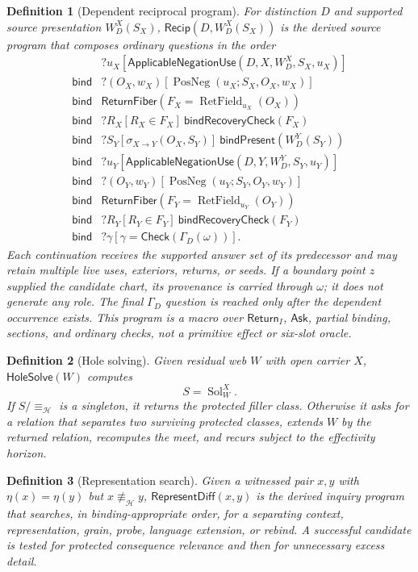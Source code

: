 \documentclass[11pt,oneside]{article}
\newtheorem{definition}{Definition}[section]
\newcommand{\RetField}{\operatorname{RetField}}
\newcommand{\PosNeg}{\operatorname{PosNeg}}
\newcommand{\bind}{\mathbin{\mathsf{bind}}}
\begin{document}
\begin{definition}[Dependent reciprocal program]\label{def:recip-program}
For distinction \(D\) and supported source presentation \(W_D^X(S_X)\), \(\mathsf{Recip}(D,W_D^X(S_X))\) is the derived source program that composes ordinary questions in the order
\[
\boxed{
\begin{aligned}
&?u_X[\mathsf{ApplicableNegationUse}(D,X,W_D^X,S_X,u_X)]\\
\bind{}&?(O_X,w_X)[\PosNeg(u_X;S_X,O_X,w_X)]\\
\bind{}&\mathsf{ReturnFiber}(F_X=\RetField_{u_X}(O_X))\\
\bind{}&?R_X[R_X\in F_X]\ \bind{}\mathsf{RecoveryCheck}(F_X)\\
\bind{}&?S_Y[\sigma_{X\to Y}(O_X,S_Y)]\ \bind{}\mathsf{Present}(W_D^Y(S_Y))\\
\bind{}&?u_Y[\mathsf{ApplicableNegationUse}(D,Y,W_D^Y,S_Y,u_Y)]\\
\bind{}&?(O_Y,w_Y)[\PosNeg(u_Y;S_Y,O_Y,w_Y)]\\
\bind{}&\mathsf{ReturnFiber}(F_Y=\RetField_{u_Y}(O_Y))\\
\bind{}&?R_Y[R_Y\in F_Y]\ \bind{}\mathsf{RecoveryCheck}(F_Y)\\
\bind{}&?\gamma[\gamma=\mathsf{Check}(\Gamma_D(\omega))].
\end{aligned}
}
\]
Each continuation receives the supported answer set of its predecessor and may retain multiple live uses, exteriors, returns, or seeds.  If a boundary point \(z\) supplied the candidate chart, its provenance is carried through \(\omega\); it does not generate any role.  The final \(\Gamma_D\) question is reached only after the dependent occurrence exists.  This program is a macro over \(\mathsf{Return}_I\), \(\mathsf{Ask}\), partial binding, sections, and ordinary checks, not a primitive effect or six-slot oracle.
\end{definition}

\begin{definition}[Hole solving]
Given residual web \(W\) with open carrier \(X\), \(\mathsf{HoleSolve}(W)\) computes
\[
S=\operatorname{Sol}^{X}_{W}.
\]
If \(S/{\equiv_{\mathcal H}}\) is a singleton, it returns the protected filler class.  Otherwise it asks for a relation that separates two surviving protected classes, extends \(W\) by the returned relation, recomputes the meet, and recurs subject to the effectivity horizon.
\end{definition}

\begin{definition}[Representation search]
Given a witnessed pair \(x,y\) with \(\eta(x)=\eta(y)\) but \(x\not\equiv_{\mathcal H}y\), \(\mathsf{RepresentDiff}(x,y)\) is the derived inquiry program that searches, in binding-appropriate order, for a separating context, representation, grain, probe, language extension, or rebind.  A successful candidate is tested for protected consequence relevance and then for unnecessary excess detail.
\end{definition}
\end{document}
